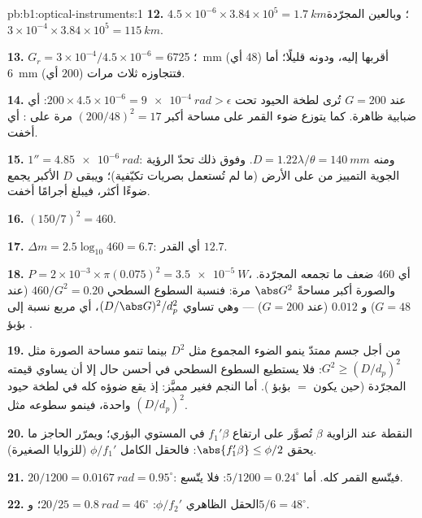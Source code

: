 \begin{solution}{pb:b1:optical-instruments:1}
\textbf{12.} $4.5\times10^{-6} \times 3.84\times10^5 = \qty{1.7}{km}$؛
وبالعين المجرّدة $3\times10^{-4} \times 3.84\times10^5 = \qty{115}{km}$.

\textbf{13.} $G_r = 3\times10^{-4}/4.5\times10^{-6} = 67$؛  \qty{25}{mm}
(أي $48$) أقربها إليه، ودونه قليلًا؛ أما \qty{6}{mm} (أي $200$) فتتجاوزه
ثلاث مرات.

\textbf{14.} عند $G = 200$ تُرى لطخة الحيود تحت $200 \times 4.5
\times10^{-6} = \qty{9e-4}{rad} > \epsilon$: أي ضبابية ظاهرة. كما يتوزع ضوء
القمر على مساحة أكبر $(200/48)^2 = 17$ مرة على
: أي أخفت.

\textbf{15.} $1'' = \qty{4.85e-6}{rad}$: ومنه $D = 1.22\lambda/\theta =
\qty{140}{mm}$. وفوق ذلك تحدّ الرؤية الجوية التمييز من على الأرض
(ما لم تُستعمل بصريات تكيّفية)؛ ويبقى $D$ الأكبر يجمع ضوءًا أكثر،
فيبلغ أجرامًا أخفت.

\textbf{16.} $(150/7)^2 = 460$.

\textbf{17.} $\Delta m = 2.5\log_{10}460 = 6.7$: أي القدر $12.7$.

\textbf{18.} $P = 2\times10^{-3} \times \pi(0.075)^2 = \qty{3.5e-5}{W}$،
أي $460$ ضعف ما تجمعه  المجرّدة. والصورة  أكبر مساحةً $\abs G^2$
مرة: فنسبة السطوع السطحي $460/G^2 = 0.20$ (عند $G = 48$) و
$0.012$ (عند $G = 200$) --- وهي تساوي $(D/\abs G)^2/d_p^2$، أي مربع نسبة
 إلى بؤبؤ .

\textbf{19.} من أجل جسم ممتدّ ينمو الضوء المجموع مثل $D^2$
بينما تنمو مساحة الصورة مثل $G^2 \geq (D/d_p)^2$: فلا يستطيع السطوع السطحي
في أحسن حال إلا أن يساوي قيمته  المجرّدة (حين يكون  $=$ بؤبؤ ). أما النجم فغير
مميَّز: إذ يقع ضوؤه كله في لطخة حيود واحدة، فينمو سطوعه
مثل $(D/d_p)^2$.

\textbf{20.} النقطة عند الزاوية $\beta$ تُصوَّر على ارتفاع $f_1'\beta$ في
المستوي البؤري؛ ويمرّر الحاجز ما يحقق $\abs{f_1'\beta} \leq \phi/2$: فالحقل
الكامل $\phi/f_1'$ (للزوايا الصغيرة).

\textbf{21.} $20/1200 = \qty{0.0167}{rad} = 0.95^\circ$: فيتّسع القمر كله.
أما $5/1200 = 0.24^\circ$: فلا يتّسع.

\textbf{22.} الحقل الظاهري $\phi/f_2'$: $20/25 = \qty{0.8}{rad} = 46^\circ$؛
و$5/6 = 48^\circ$.


\end{solution}
